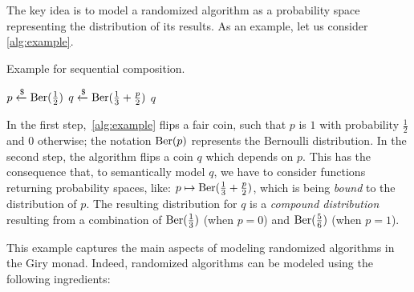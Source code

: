 The key idea is to model a randomized algorithm as a probability space representing the distribution of its results.
As an example, let us consider \cref{alg:example}.
\begin{algorithm}[h!]
\caption{Example for sequential composition.}\label{alg:example}
\begin{algorithmic}[1]
\State $p \xleftarrow{\$} \operatorname{\mathrm{Ber}}(\frac{1}{2})$
\State $q \xleftarrow{\$} \operatorname{\mathrm{Ber}}(\frac{1}{3}+\frac{p}{2})$
\State \Return $q$
\end{algorithmic}
\end{algorithm}%

In the first step,~\cref{alg:example} flips a fair coin, such that $p$ is $1$ with probability $\frac{1}{2}$ and $0$ otherwise; the notation $\operatorname{\mathrm{Ber}}(p)$ represents the Bernoulli distribution.
In the second step, the algorithm flips a coin $q$ which depends on $p$.
This has the consequence that, to semantically model $q$, we have to consider functions returning probability spaces, like: $p \mapsto \operatorname{\mathrm{Ber}}(\frac{1}{3}+\frac{p}{2})$, which is being \emph{bound} to the distribution of $p$.
The resulting distribution for $q$ is a \emph{compound distribution} resulting from a combination of $\operatorname{\mathrm{Ber}}(\frac{1}{3})$ (when $p = 0$) and $\operatorname{\mathrm{Ber}}(\frac{5}{6})$ (when $p = 1$).

This example captures the main aspects of modeling randomized algorithms in the Giry monad.
Indeed, randomized algorithms can be modeled using the following ingredients:

